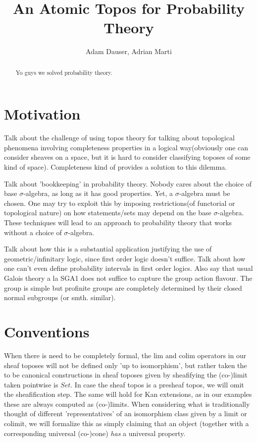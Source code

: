 \documentclass[a4paper]{amsproc}
\title{\textbf{An Atomic Topos for Probability Theory}}
\author{Adam Dauser, Adrian Marti}
\date{}
\theoremstyle{plain}
\theoremstyle{definition}
\theoremstyle{remark}
\numberwithin{equation}{section}
\begin{document}
\maketitle

\begin{center}
\begin{minipage}{\textwidth}
\begin{abstract}
Yo guys we solved probability theory. %
\end{abstract}
\end{minipage}
\end{center}
\tableofcontents 
\section{Motivation}

Talk about the challenge of using topos theory for talking about topological phenomena involving completeness properties in a logical way(obviously one can consider sheaves on a space, but it is hard to consider classifying toposes of some kind of space). Completeness kind of provides a solution to this dilemma.

Talk about 'bookkeeping' in probability theory. Nobody cares about the choice of base $\sigma$-algebra, as long as it has good properties. Yet, a $\sigma$-algebra must be chosen. One may try to exploit this by imposing restrictions(of functorial or topological nature) on how statements/sets may depend on the base $\sigma$-algebra. These techniques will lead to an approach to probability theory that works without a choice of $\sigma$-algebra.

Talk about how this is a substantial application justifying the use of geometric/infinitary logic, since first order logic doesn't suffice. Talk about how one can't even define probability intervals in first order logics. Also say that usual Galois theory a la SGA1 does not suffice to capture the group action flavour. The group is simple but profinite groups are completely determined by their closed normal subgroups (or smth. similar).

\section{Conventions} \label{conventions}

When there is need to be completely formal, the lim and colim operators in our sheaf toposes will not be defined only 'up to isomorphism', but rather taken the to be canonical constructions in sheaf toposes given by sheafifying the (co-)limit taken pointwise is $Set$. In case the sheaf topos is a presheaf topos, we will omit the sheafification step. The same will hold for Kan extensions, as in our examples these are always computed as (co-)limits. When considering what is traditionally thought of different 'representatives' of an isomorphism class given by a limit or colimit, we will formalize this as simply claiming that an object (together with a corresponding universal (co-)cone) \emph{has} a universal property.
\end{document}
